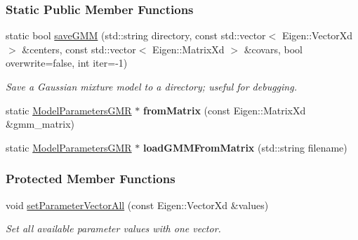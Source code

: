\subsubsection*{Static Public Member Functions}
\begin{DoxyCompactItemize}
\item 
static bool \hyperlink{classDmpBbo_1_1ModelParametersGMR_aa72f6b9228bddbd48c217022317da836}{save\+G\+M\+M} (std\+::string directory, const std\+::vector$<$ Eigen\+::\+Vector\+Xd $>$ \&centers, const std\+::vector$<$ Eigen\+::\+Matrix\+Xd $>$ \&covars, bool overwrite=false, int iter=-\/1)
\begin{DoxyCompactList}\small\item\em Save a Gaussian mixture model to a directory; useful for debugging. \end{DoxyCompactList}\item 
\hypertarget{classDmpBbo_1_1ModelParametersGMR_a1cdfcf930e53d0a3b5d080fa1472d771}{static \hyperlink{classDmpBbo_1_1ModelParametersGMR}{Model\+Parameters\+G\+M\+R} $\ast$ {\bfseries from\+Matrix} (const Eigen\+::\+Matrix\+Xd \&gmm\+\_\+matrix)}\label{classDmpBbo_1_1ModelParametersGMR_a1cdfcf930e53d0a3b5d080fa1472d771}

\item 
\hypertarget{classDmpBbo_1_1ModelParametersGMR_a341d9a87feb0d3ab1a668a8d14dc4140}{static \hyperlink{classDmpBbo_1_1ModelParametersGMR}{Model\+Parameters\+G\+M\+R} $\ast$ {\bfseries load\+G\+M\+M\+From\+Matrix} (std\+::string filename)}\label{classDmpBbo_1_1ModelParametersGMR_a341d9a87feb0d3ab1a668a8d14dc4140}

\end{DoxyCompactItemize}
\subsubsection*{Protected Member Functions}
\begin{DoxyCompactItemize}
\item 
void \hyperlink{classDmpBbo_1_1ModelParametersGMR_a9d3c8f22e8237a805af4935a647e5a50}{set\+Parameter\+Vector\+All} (const Eigen\+::\+Vector\+Xd \&values)
\begin{DoxyCompactList}\small\item\em Set all available parameter values with one vector. \end{DoxyCompactList}\end{DoxyCompactItemize}
